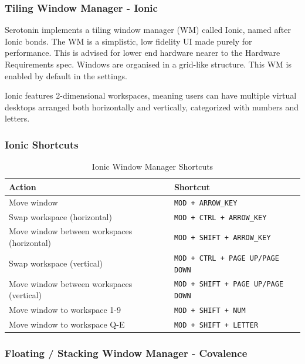 \documentclass[11pt,a4paper]{article}
\begin{document}
    \subsubsection{Tiling Window Manager - Ionic}

	Serotonin implements a tiling window manager (WM) called Ionic, named after Ionic bonds.
	The WM is a simplistic, low fidelity UI made purely for performance.
	This is advised for lower end hardware nearer to the Hardware Requirements spec.
	Windows are organised in a grid-like structure.
	This WM is enabled by default in the settings.

	Ionic features 2-dimensional workspaces, meaning users can have multiple virtual desktops arranged both horizontally and vertically, categorized with numbers and letters.

	\subsubsection{Ionic Shortcuts}

	\begin{table}[h]
		\centering
		\begin{tabular}{|l|l|}
			\hline
			\textbf{Action} & \textbf{Shortcut} \\
			\hline
			Move window & \lstinline{MOD + ARROW_KEY} \\
			\hline
			Swap workspace (horizontal) & \lstinline{MOD + CTRL + ARROW_KEY} \\
			\hline
			Move window between workspaces (horizontal) & \lstinline{MOD + SHIFT + ARROW_KEY} \\
			\hline
			Swap workspace (vertical) & \lstinline{MOD + CTRL + PAGE UP/PAGE DOWN} \\
			\hline
			Move window between workspaces (vertical) & \lstinline{MOD + SHIFT + PAGE UP/PAGE DOWN} \\
			\hline
			Move window to workspace 1-9 & \lstinline{MOD + SHIFT + NUM} \\
			\hline
			Move window to workspace Q-E & \lstinline{MOD + SHIFT + LETTER} \\
			\hline
		\end{tabular}
		\caption{Ionic Window Manager Shortcuts}
	\end{table}
    \subsubsection{Floating / Stacking Window Manager - Covalence}
\end{document}
